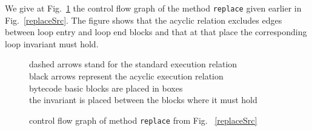 We give at Fig.~\ref{blockBC} the control flow graph of the method \texttt{replace} given earlier in Fig.~\ref{replaceSrc}. The figure shows that the acyclic relation
excludes edges between loop entry and loop end blocks and that at that place the corresponding loop invariant must hold.  

\begin{figure}[!ht]
\begin{center}
\end{center}
dashed arrows stand for the standard execution relation \\ 
black arrows represent the acyclic execution relation \\
bytecode basic blocks are placed in boxes \\
the invariant is placed between the blocks where it must hold
\caption{control flow graph of method \texttt{replace} from Fig. ~\ref{replaceSrc} }
\label{blockBC}
\end{figure}


